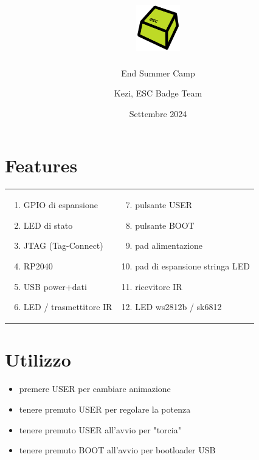 \documentclass[10pt]{datasheet}
\title{\includegraphics[height=2cm]{logo} \raisebox{1\height}{Hardware mini-badge}}
\author{End Summer Camp}
\date{Settembre 2024}
\author{Kezi, ESC Badge Team}
\begin{document}
	\maketitle
	
	\section{Features}
	\begin{tabular}{l l}
		  \begin{minipage}{1.5in}

				\begin{enumerate}[itemsep=1pt]
				\item{GPIO di espansione}
				\item{LED di stato}
				\item{JTAG (Tag-Connect)}
				\item{RP2040}
				\item{USB power+dati}
				\item{LED / trasmettitore IR}

			\end{enumerate} 
			
			\end{minipage}&
				  \begin{minipage}{2in}

			\begin{enumerate}[itemsep=1pt]
			\setcounter{enumi}{6}
			\item{pulsante USER}
			\item{pulsante BOOT}
			\item{pad alimentazione}
			\item{pad di espansione stringa LED}
			\item{ricevitore IR}
			\item LED ws2812b / sk6812
			\end{enumerate} 
			
		\end{minipage}
	\end{tabular}

	
	\section{Utilizzo}
	
	\begin{itemize}[itemsep=1pt] 
		\item{premere USER per cambiare animazione}
		\item{tenere premuto USER per regolare la potenza}
		\item{tenere premuto USER all'avvio per "torcia"}
		\item{tenere premuto BOOT all'avvio per bootloader USB}
	\end{itemize}
	
\end{document}
